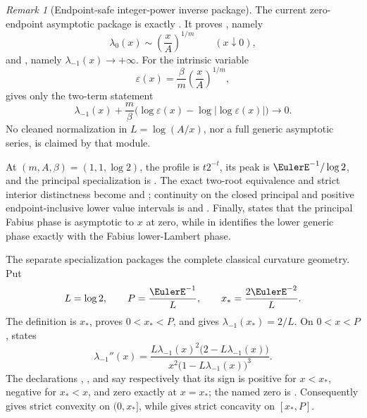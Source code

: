 \documentclass[11pt]{article}
\theoremstyle{remark}
\newtheorem{remark}[remark]{Remark}
\begin{document}
\begin{remark}[Endpoint-safe integer-power inverse package]
The current zero-endpoint asymptotic package is exactly
.  It proves
, namely
\[
 \lambda_0(x)\sim\left(\frac{x}{A}\right)^{1/m}
 \qquad (x\downarrow0),
\]
and , namely
\(\lambda_{-1}(x)\to+\infty\).  For the intrinsic variable
\[
 \varepsilon(x)=\frac{\beta}{m}
   \left(\frac{x}{A}\right)^{1/m},
\]
 gives only
the two-term statement
\[
 \lambda_{-1}(x)+\frac{m}{\beta}
 \bigl(\log\varepsilon(x)-\log|\log\varepsilon(x)|\bigr)
 \longrightarrow 0.
\]
No cleaned normalization in \(L=\log(A/x)\), nor a full generic asymptotic
series, is claimed by that module.

At \((m,A,\beta)=(1,1,\log2)\), the profile is
\(t2^{-t}\), its peak is \(\EulerE^{-1}/\log2\), and the principal specialization
is .  The exact two-root equivalence and
strict interior distinctness become
 and
; continuity on the
closed principal and positive endpoint-inclusive lower value intervals is
 and
.  Finally,
 states that the principal
Fabius phase is asymptotic to \(x\) at zero, while
 in
 identifies the lower generic phase
exactly with the Fabius lower-Lambert phase.

The separate specialization
 packages the complete
classical curvature geometry.  Put
\[
 L=\log2,\qquad P=\frac{\EulerE^{-1}}L,
 \qquad x_*=\frac{2\EulerE^{-2}}L.
\]
The definition  is \(x_*\),
 proves \(0<x_*<P\), and
 gives
\(\lambda_{-1}(x_*)=2/L\).  On \(0<x<P\),
 states
\begin{equation}\label{eq:fabius-lower-phase-second-derivative}
 \lambda_{-1}''(x)
 =\frac{L\lambda_{-1}(x)^2\bigl(2-L\lambda_{-1}(x)\bigr)}
 {x^2\bigl(1-L\lambda_{-1}(x)\bigr)^3}.
\end{equation}
The declarations ,
, and
 say respectively that its
sign is positive for \(x<x_*\), negative for \(x_*<x\), and zero exactly at
\(x=x_*\); the named zero is
.  Consequently
 gives strict convexity on
\((0,x_*]\), while  gives
strict concavity on \([x_*,P]\).


\end{remark}
\end{document}
